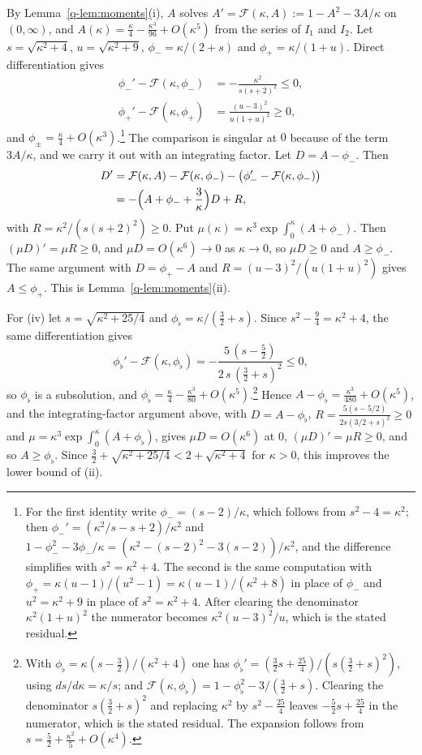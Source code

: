 \documentclass[aps,prd,twocolumn,superscriptaddress,nofootinbib,longbibliography,floatfix,amsmath,amssymb,10pt]{revtex4-2}
\theoremstyle{definition}
\theoremstyle{remark}
\begin{document}
By Lemma~\ref{q-lem:moments}(i), $A$ solves $A'=\mathcal F(\kappa,A):=1-A^2-
3A/\kappa$ on $(0,\infty)$, and $A(\kappa)=\frac\kappa4-\frac{\kappa^3}{96}+
O(\kappa^5)$ from the series of $I_1$ and $I_2$. Let $s=\sqrt{\kappa^2+4}$,
$u=\sqrt{\kappa^2+9}$, $\phi_-=\kappa/(2+s)$ and $\phi_+=\kappa/(1+u)$. Direct
differentiation gives
\[
\begin{aligned}
\phi_-'-\mathcal F(\kappa,\phi_-)&=-\frac{\kappa^2}{s(s+2)^2}\le0,\\
\phi_+'-\mathcal F(\kappa,\phi_+)&=\frac{(u-3)^2}{u(1+u)^2}\ge0,
\end{aligned}
\]
and $\phi_\pm=\frac\kappa4+O(\kappa^3)$.\footnote{For the first identity write
$\phi_-=(s-2)/\kappa$, which follows from $s^2-4=\kappa^2$; then
$\phi_-'=(\kappa^2/s-s+2)/\kappa^2$ and $1-\phi_-^2-3\phi_-/\kappa=
(\kappa^2-(s-2)^2-3(s-2))/\kappa^2$, and the difference simplifies with
$s^2=\kappa^2+4$. The second is the same computation with
$\phi_+=\kappa(u-1)/(u^2-1)=\kappa(u-1)/(\kappa^2+8)$ in place of $\phi_-$
and $u^2=\kappa^2+9$ in place of $s^2=\kappa^2+4$. After clearing the denominator $\kappa^2(1+u)^2$ the
numerator becomes $\kappa^2(u-3)^2/u$, which is the stated residual.} The comparison is singular at $0$
because of the term $3A/\kappa$, and we carry it out with an integrating
factor. Let $D=A-\phi_-$. Then
\[
\begin{aligned}
D'&=\mathcal F(\kappa,A)-\mathcal F(\kappa,\phi_-)-\bigl(\phi_-'-\mathcal F(
\kappa,\phi_-)\bigr)\\
&=-\Bigl(A+\phi_-+\frac3\kappa\Bigr)D+R,
\end{aligned}
\]
with $R=\kappa^2/(s(s+2)^2)\ge0$. Put $\mu(\kappa)=\kappa^3\exp\int_0^\kappa
(A+\phi_-)$. Then $(\mu D)'=\mu R\ge0$, and $\mu D=O(\kappa^6)\to0$ as
$\kappa\to0$, so $\mu D\ge0$ and $A\ge\phi_-$. The same argument with
$D=\phi_+-A$ and $R=(u-3)^2/(u(1+u)^2)$ gives $A\le\phi_+$. This is
Lemma~\ref{q-lem:moments}(ii).

For (iv) let $s=\sqrt{\kappa^2+25/4}$ and $\phi_\flat=\kappa/(\frac32+s)$.
Since $s^2-\frac94=\kappa^2+4$, the same differentiation gives
\[
\phi_\flat'-\mathcal F(\kappa,\phi_\flat)=-\frac{5\,(s-\frac52)}{2\,s\,
(\frac32+s)^2}\le0,
\]
so $\phi_\flat$ is a subsolution, and $\phi_\flat=\frac\kappa4-\frac{\kappa^3}
{80}+O(\kappa^5)$.\footnote{With $\phi_\flat=\kappa(s-\frac32)/(\kappa^2+4)$ one
has $\phi_\flat'=(\frac32 s+\frac{25}4)/(s(\frac32+s)^2)$, using $ds/d\kappa=
\kappa/s$; and $\mathcal F(\kappa,\phi_\flat)=1-\phi_\flat^2-3/(\frac32+s)$.
Clearing the denominator $s(\frac32+s)^2$ and replacing $\kappa^2$ by
$s^2-\frac{25}4$ leaves $-\frac52 s+\frac{25}4$ in the numerator, which is the
stated residual. The expansion follows from $s=\frac52+\frac{\kappa^2}5+
O(\kappa^4)$.} Hence $A-\phi_\flat=\frac{\kappa^3}{480}+O(\kappa^5)$, and the
integrating-factor argument above, with $D=A-\phi_\flat$, $R=\frac{5(s-5/2)}
{2s(3/2+s)^2}\ge0$ and $\mu=\kappa^3\exp\int_0^\kappa(A+\phi_\flat)$, gives
$\mu D=O(\kappa^6)$ at $0$, $(\mu D)'=\mu R\ge0$, and so $A\ge\phi_\flat$. Since
$\frac32+\sqrt{\kappa^2+25/4}<2+\sqrt{\kappa^2+4}$ for $\kappa>0$, this
improves the lower bound of (ii).
\end{document}
